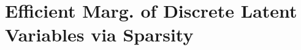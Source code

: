 \documentclass[xetex,aspectratio=169,xcolor,professionalfonts,hyperref]{beamer}
\begin{document}
\section{Efficient Marg. of Discrete Latent Variables via Sparsity}






\end{document}
